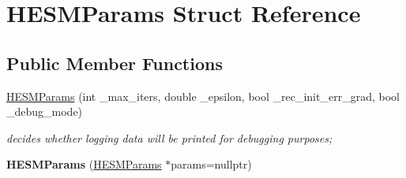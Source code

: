 \hypertarget{structHESMParams}{\section{H\-E\-S\-M\-Params Struct Reference}
\label{structHESMParams}
}
\subsection*{Public Member Functions}
\begin{DoxyCompactItemize}
\item 
\hyperlink{structHESMParams_a267b8be732ff048f01159e056184133b}{H\-E\-S\-M\-Params} (int \-\_\-max\-\_\-iters, double \-\_\-epsilon, bool \-\_\-rec\-\_\-init\-\_\-err\-\_\-grad, bool \-\_\-debug\-\_\-mode)
\begin{DoxyCompactList}\small\item\em decides whether logging data will be printed for debugging purposes; \end{DoxyCompactList}\item 
\hypertarget{structHESMParams_a9a2cbc081cf02a13407be2c7595e0272}{{\bfseries H\-E\-S\-M\-Params} (\hyperlink{structHESMParams}{H\-E\-S\-M\-Params} $\ast$params=nullptr)}\label{structHESMParams_a9a2cbc081cf02a13407be2c7595e0272}

\end{DoxyCompactItemize}
